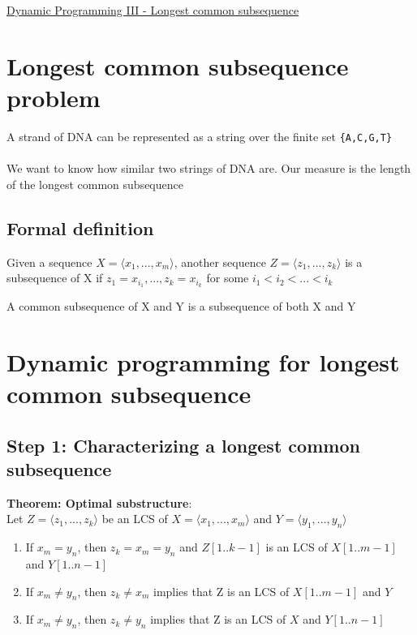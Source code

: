\documentclass{article}[18pt]
\begin{document}
\begin{center}
\underline{\huge Dynamic Programming III - Longest common subsequence}
\end{center}
\section{Longest common subsequence problem}
A strand of DNA can be represented as a string over the finite set \texttt{\{A,C,G,T\}}\\
\\
We want to know how similar two strings of DNA are. Our measure is the length of the longest common subsequence
\subsection{Formal definition}
\begin{defin}[Subsequence]
Given a sequence $X=\langle x_1,...,x_m \rangle$, another sequence $Z=\langle z_1,...,z_k \rangle$ is a subsequence of X if $z_1=x_{i_1},...,z_k=x_{i_k}$ for some $i_1<i_2<...<i_k$
\end{defin}
\begin{defin}
A common subsequence of X and Y is a subsequence of both X and Y
\end{defin}
\section{Dynamic programming for longest common subsequence}
\subsection{Step 1: Characterizing a longest common subsequence}
\textbf{Theorem: Optimal substructure}:\\
Let $Z=\langle z_1,...,z_k \rangle$ be an LCS of $X=\langle x_1,...,x_m \rangle$ and $Y=\langle y_1,...,y_n \rangle$
\begin{enumerate}
	\item If $x_m=y_n$, then $z_k=x_m=y_n$ and $Z[1..k-1]$ is an LCS of $X[1..m-1]$ and $Y[1..n-1]$
	\item If $x_m\neq y_n$, then $z_k\neq x_m$ implies that Z is an LCS of $X[1..m-1]$ and $Y$
	\item If $x_m\neq y_n$, then $z_k\neq y_n$ implies that Z is an LCS of $X$ and $Y[1..n-1]$
\end{enumerate}
\end{document}
